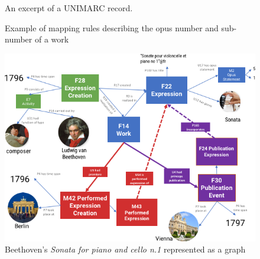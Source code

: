 \documentclass{article}
\begin{document}
\begin{figure}
 \centerline{}
  \caption{An excerpt of a UNIMARC record.}
 \label{fig:unimarc}
 \smallskip
 \centerline{}
  \caption{Example of mapping rules describing the opus number and sub-number of a work}
 \label{fig:mappings}
\end{figure}

\begin{figure}
 \centerline{
 \includegraphics[width=\columnwidth]{figs/schema.png}}
 \caption{Beethoven's \textit{Sonata for piano and cello n.1} represented as a graph}
 \label{fig:schema}
\end{figure}
\end{document}
